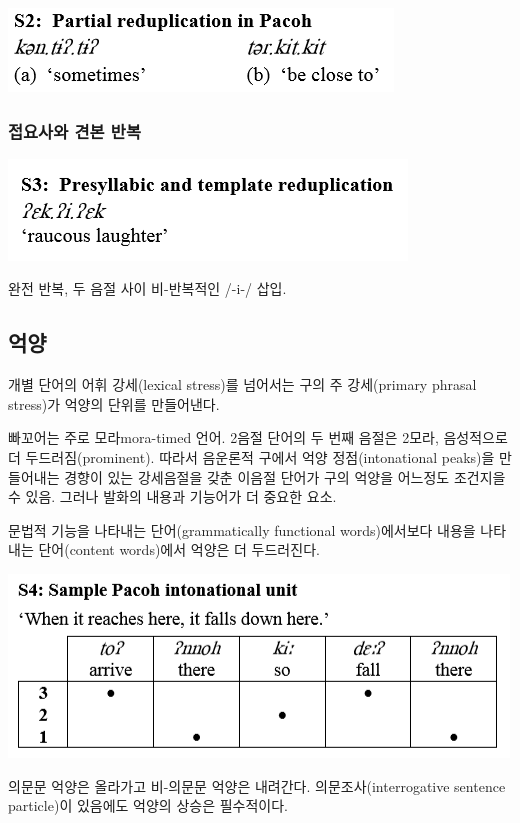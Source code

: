 \includegraphics{Pacoh/src/PacohS2.png}

\subsubsection{접요사와 견본 반복}
\includegraphics{Pacoh/src/PacohS3.png}

완전 반복, 두 음절 사이 비-반복적인 /-i-/ 삽입.

\subsection{억양}
개별 단어의 어휘 강세(lexical stress)를 넘어서는 구의 주 강세(primary phrasal stress)가 억양의 단위를 만들어낸다.

빠꼬어는 주로 모라mora-timed 언어. 2음절 단어의 두 번째 음절은 2모라, 음성적으로 더 두드러짐(prominent). 따라서 음운론적 구에서 억양 정점(intonational peaks)을 만들어내는 경향이 있는 강세음절을 갖춘 이음절 단어가 구의 억양을 어느정도 조건지을 수 있음. 그러나 발화의 내용과 기능어가 더 중요한 요소.

문법적 기능을 나타내는 단어(grammatically functional words)에서보다 내용을 나타내는 단어(content words)에서 억양은 더 두드러진다.

\includegraphics{Pacoh/src/PacohS4.png}

의문문 억양은 올라가고 비-의문문 억양은 내려간다. 의문조사(interrogative sentence particle)이 있음에도 억양의 상승은 필수적이다. 

